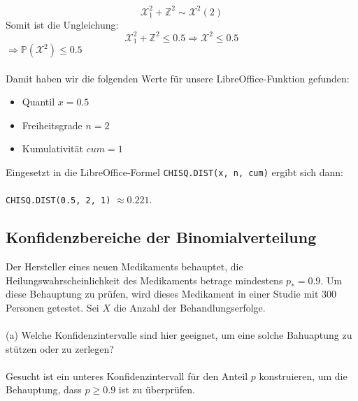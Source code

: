 \documentclass[a4paper]{article}
\begin{document}
\[\mathcal{X}_1^2 + \mathbb{Z}^2 \sim \mathcal{X}^2(2)\]
Somit ist die Ungleichung:\\
\[\mathcal{X}_1^2 + \mathbb{Z}^2 \leq 0.5 \Rightarrow \mathcal{X}^2 \leq 0.5\]
$\Rightarrow \mathbb{P}(\mathcal{X}^2) \leq 0.5$\\\\
Damit haben wir die folgenden Werte für unsere LibreOffice-Funktion gefunden:\\
\begin{itemize}[label=\(\rightarrow\)]
    \item Quantil $x = 0.5$
    \item Freiheitsgrade $n = 2$
    \item Kumulativität $cum = 1$
\end{itemize}
Eingesetzt in die LibreOffice-Formel \texttt{CHISQ.DIST(x, n, cum)} ergibt sich dann:\\\\
\texttt{CHISQ.DIST(0.5, 2, 1)} $\approx 0.221$.
\subsection{Konfidenzbereiche der Binomialverteilung}
Der Hersteller eines neuen Medikaments behauptet, die Heilungswahrscheinlichkeit des Medikaments betrage mindestens $p_\ast = 0.9$. Um diese Behauptung zu prüfen, wird dieses Medikament in einer Studie mit 300 Personen getestet. Sei $X$ die Anzahl der Behandlungserfolge.\\\\
(a) Welche Konfidenzintervalle sind hier geeignet, um eine solche Bahuaptung zu stützen oder zu zerlegen?\\\\
Gesucht ist ein unteres Konfidenzintervall für den Anteil \( p \) konstruieren, um die Behauptung, dass \( p \geq 0.9 \) ist zu überprüfen.
\end{document}
